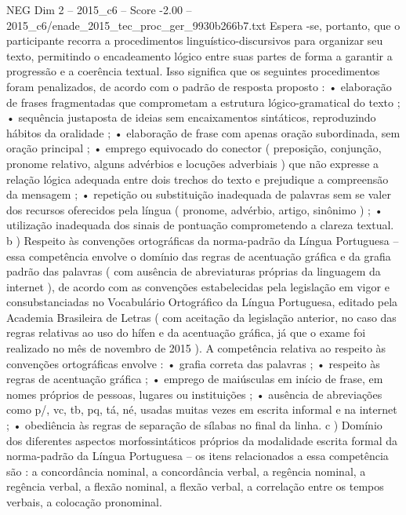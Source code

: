 \begin{textsample}{NEG Dim 2 – 2015\_c6 – Score -2.00 – 2015\_c6/enade\_2015\_tec\_proc\_ger\_9930b266b7.txt}
Espera -se, portanto, que o participante recorra a procedimentos linguístico-discursivos para organizar seu texto, permitindo o encadeamento lógico entre suas partes de forma a garantir a progressão e a coerência textual.
Isso significa que os seguintes procedimentos foram penalizados, de acordo com o padrão de resposta proposto : • elaboração de frases fragmentadas que comprometam a estrutura lógico-gramatical do texto ; • sequência justaposta de ideias sem encaixamentos sintáticos, reproduzindo hábitos da oralidade ; • elaboração de frase com apenas oração subordinada, sem oração principal ; • emprego equivocado do conector ( preposição, conjunção, pronome relativo, alguns advérbios e locuções adverbiais ) que não expresse a relação lógica adequada entre dois trechos do texto e prejudique a compreensão da mensagem ; • repetição ou substituição inadequada de palavras sem se valer dos recursos oferecidos pela língua ( pronome, advérbio, artigo, sinônimo ) ; • utilização inadequada dos sinais de pontuação comprometendo a clareza textual. b ) Respeito às convenções ortográficas da norma-padrão da Língua Portuguesa – essa competência envolve o domínio das regras de acentuação gráfica e da grafia padrão das palavras ( com ausência de abreviaturas próprias da linguagem da internet ), de acordo com as convenções estabelecidas pela legislação em vigor e consubstanciadas no Vocabulário Ortográfico da Língua Portuguesa, editado pela Academia Brasileira de Letras ( com aceitação da legislação anterior, no caso das regras relativas ao uso do hífen e da acentuação gráfica, já que o exame foi realizado no mês de novembro de 2015 ).
A competência relativa ao respeito às convenções ortográficas envolve : • grafia correta das palavras ; • respeito às regras de acentuação gráfica ; • emprego de maiúsculas em início de frase, em nomes próprios de pessoas, lugares ou instituições ; • ausência de abreviações como p/, vc, tb, pq, tá, né, usadas muitas vezes em escrita informal e na internet ; • obediência às regras de separação de sílabas no final da linha. c ) Domínio dos diferentes aspectos morfossintáticos próprios da modalidade escrita formal da norma-padrão da Língua Portuguesa – os itens relacionados a essa competência são : a concordância nominal, a concordância verbal, a regência nominal, a regência verbal, a flexão nominal, a flexão verbal, a correlação entre os tempos verbais, a colocação pronominal.

\end{textsample}
